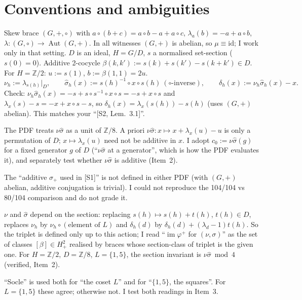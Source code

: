 \documentclass[11pt]{article}
\newcommand{\Z}{\mathbb{Z}}
\newcommand{\Aut}{\operatorname{Aut}}
\newcommand{\im}{\operatorname{im}}
\newcommand{\sh}{\hat\sigma}
\begin{document}
\section*{Conventions and ambiguities}
Skew brace $(G,+,\circ)$ with $a\circ(b+c)=a\circ b-a+a\circ c$,
$\lambda_a(b)=-a+a\circ b$, $\lambda:(G,\circ)\to\Aut(G,+)$. In all witnesses
$(G,+)$ is abelian, so $\mu\equiv\mathrm{id}$; I work only in that setting.
$D$ is an ideal, $H=G/D$, $s$ a normalised set-section ($s(0)=0$). Additive
2-cocycle $\beta(k,k'):=s(k)+s(k')-s(k+k')\in D$. For $H=\Z/2$: $u:=s(1)$,
$b:=\beta(1,1)=2u$.
\[
\nu_h:=\lambda_{s(h)}|_D,\qquad \sh_h(x):=s(h)^{-1}\circ x\circ s(h)\ (\circ\text{-inverse}),\qquad
\delta_h(x):=\nu_h\sh_h(x)-x.
\]
Check: $\nu_h\sh_h(x)=-s+s\circ s^{-1}\circ x\circ s=-s+x\circ s$ and
$\lambda_x(s)-s=-x+x\circ s-s$, so $\delta_h(x)=\lambda_x(s(h))-s(h)$ (uses $(G,+)$
abelian). This matches your ``[S2, Lem.~3.1]''.

\begin{description}[leftmargin=1.5em,style=nextline]
\item[A1 (``$\nu\sh$ mod 4'').] The PDF treats $\nu\sh$ as a unit of $\Z/8$. A priori
$\nu\sh: x\mapsto x+\lambda_x(u)-u$ is only a permutation of $D$; $x\mapsto\lambda_x(u)$
need not be additive in $x$. I adopt $c_0:=\nu\sh(g)$ for a fixed generator $g$ of $D$
(``$\nu\sh$ at a generator'', which is how the PDF evaluates it), and separately test
whether $\nu\sh$ is additive (Item~2).
\item[A2 ($\sigma_+$).] The ``additive $\sigma_+$ used in [S1]'' is not defined in either
PDF (with $(G,+)$ abelian, additive conjugation is trivial). I could not reproduce the
104/104 vs 80/104 comparison and do not grade it.
\item[A3 (what is ``$\im\varphi^+$'' for a fixed triplet).] $\nu$ and $\sh$ depend on the
section: replacing $s(h)\mapsto s(h)+t(h)$, $t(h)\in D$, replaces $\nu_h$ by
$\nu_h\circ(\text{element of }L)$ and $\delta_h(d)$ by $\delta_h(d)+(\lambda_d-1)t(h)$.
So the triplet is defined only up to this action; I read ``$\im\varphi^+$ for
$(\nu,\sigma)$'' as the set of classes $[\beta]\in H^2_+$ realised by braces whose
section-class of triplet is the given one. For $H=\Z/2$, $D=\Z/8$, $L=\{1,5\}$, the
section invariant is $\nu\sh\bmod 4$ (verified, Item~2).
\item[A4 (``socle'').] ``Socle'' is used both for ``the coset $L$'' and for
``$\{1,5\}$, the squares''. For $L=\{1,5\}$ these agree; otherwise not. I test both
readings in Item~3.
\end{description}
\end{document}
